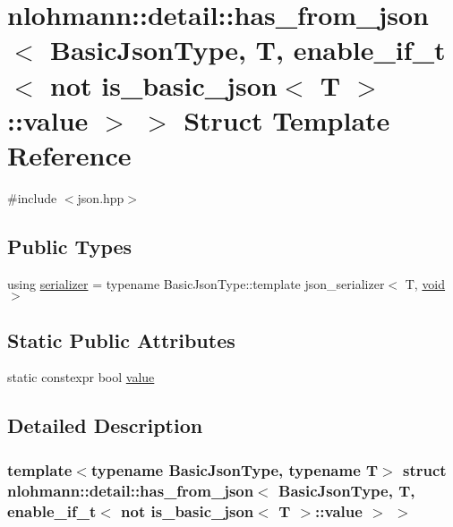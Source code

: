 \hypertarget{structnlohmann_1_1detail_1_1has__from__json_3_01_basic_json_type_00_01_t_00_01enable__if__t_3_01e29213c543deddccc314d19cbaf9f3b4}{}\section{nlohmann\+::detail\+::has\+\_\+from\+\_\+json$<$ Basic\+Json\+Type, T, enable\+\_\+if\+\_\+t$<$ not is\+\_\+basic\+\_\+json$<$ T $>$\+::value $>$ $>$ Struct Template Reference}
\label{structnlohmann_1_1detail_1_1has__from__json_3_01_basic_json_type_00_01_t_00_01enable__if__t_3_01e29213c543deddccc314d19cbaf9f3b4}


{\ttfamily \#include $<$json.\+hpp$>$}

\subsection*{Public Types}
\begin{DoxyCompactItemize}
\item 
using \mbox{\hyperlink{structnlohmann_1_1detail_1_1has__from__json_3_01_basic_json_type_00_01_t_00_01enable__if__t_3_01e29213c543deddccc314d19cbaf9f3b4_ab17cea1be422b8985fc19942809560ed}{serializer}} = typename Basic\+Json\+Type\+::template json\+\_\+serializer$<$ T, \mbox{\hyperlink{namespacenlohmann_1_1detail_a59fca69799f6b9e366710cb9043aa77d}{void}} $>$
\end{DoxyCompactItemize}
\subsection*{Static Public Attributes}
\begin{DoxyCompactItemize}
\item 
static constexpr bool \mbox{\hyperlink{structnlohmann_1_1detail_1_1has__from__json_3_01_basic_json_type_00_01_t_00_01enable__if__t_3_01e29213c543deddccc314d19cbaf9f3b4_afb638d592883301228bcad21d83bf4aa}{value}}
\end{DoxyCompactItemize}


\subsection{Detailed Description}
\subsubsection*{template$<$typename Basic\+Json\+Type, typename T$>$\newline
struct nlohmann\+::detail\+::has\+\_\+from\+\_\+json$<$ Basic\+Json\+Type, T, enable\+\_\+if\+\_\+t$<$ not is\+\_\+basic\+\_\+json$<$ T $>$\+::value $>$ $>$}



